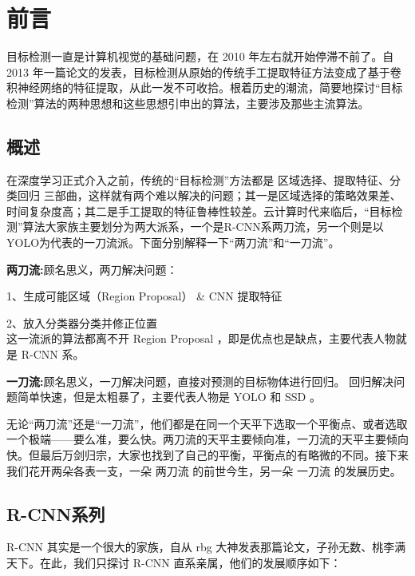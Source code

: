 \section{前言}
\setcounter{figure}{0}

目标检测一直是计算机视觉的基础问题，在 2010 年左右就开始停滞不前了。自 2013 年一篇论文的发表，目标检测从原始的传统手工提取特征方法变成了基于卷积神经网络的特征提取，从此一发不可收拾。根着历史的潮流，简要地探讨“目标检测”算法的两种思想和这些思想引申出的算法，主要涉及那些主流算法。
\subsection{概述}
在深度学习正式介入之前，传统的“目标检测”方法都是 区域选择、提取特征、分类回归 三部曲，这样就有两个难以解决的问题；其一是区域选择的策略效果差、时间复杂度高；其二是手工提取的特征鲁棒性较差。云计算时代来临后，“目标检测”算法大家族主要划分为两大派系，一个是R-CNN系两刀流，另一个则是以YOLO为代表的一刀流派。下面分别解释一下“两刀流”和“一刀流”。

\textbf{两刀流:}顾名思义，两刀解决问题：

1、生成可能区域（Region Proposal） \& CNN 提取特征 

2、放入分类器分类并修正位置 \\
这一流派的算法都离不开 Region Proposal ，即是优点也是缺点，主要代表人物就是 R-CNN 系。

\textbf{一刀流:}顾名思义，一刀解决问题，直接对预测的目标物体进行回归。
回归解决问题简单快速，但是太粗暴了，主要代表人物是 YOLO 和 SSD 。

无论“两刀流”还是“一刀流”，他们都是在同一个天平下选取一个平衡点、或者选取一个极端——要么准，要么快。两刀流的天平主要倾向准，一刀流的天平主要倾向快。但最后万剑归宗，大家也找到了自己的平衡，平衡点的有略微的不同。接下来我们花开两朵各表一支，一朵 两刀流 的前世今生，另一朵 一刀流 的发展历史。
\subsection{R-CNN系列}
R-CNN 其实是一个很大的家族，自从 rbg 大神发表那篇论文，子孙无数、桃李满天下。在此，我们只探讨 R-CNN 直系亲属，他们的发展顺序如下：

\vspace{10pt}


